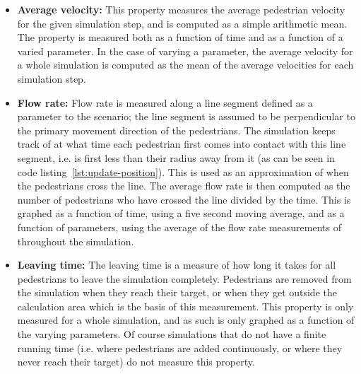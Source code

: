 \begin{itemize}

    \item \textbf{Average velocity:} This property measures the average pedestrian 
        velocity for the given simulation step, and is computed as a simple 
        arithmetic mean. The property is measured both as a function of time 
        and as a function of a varied parameter. In the case of varying a 
        parameter, the average velocity for a whole simulation is computed as 
        the mean of the average velocities for each simulation step.

    \item \textbf{Flow rate:} Flow rate is measured along a line segment 
        defined as a parameter to the scenario; the line segment is assumed to 
        be perpendicular to the primary movement direction of the pedestrians. 
        The simulation keeps track of at what time each pedestrian first comes 
        into contact with this line segment, i.e. is first less than their 
        radius away from it (as can be seen in code 
        listing~\ref{lst:update-position}). This is used as an approximation 
        of when the pedestrians cross the line. The average flow rate is then 
        computed as the number of pedestrians who have crossed the line 
        divided by the time.  This is graphed as a function of time, using a 
        five second moving average, and as a function of parameters, using the 
        average of the flow rate measurements of throughout the simulation.

    \item \textbf{Leaving time:} The leaving time is a measure of how long it 
        takes for all pedestrians to leave the simulation completely. Pedestrians are 
        removed from the simulation when they reach their target, or when they 
        get outside the calculation area which is the basis of this 
        measurement. This property is only measured for a whole simulation, 
        and as such is only graphed as a function of the varying parameters. 
        Of course simulations that do not have a finite running time (i.e. 
        where pedestrians are added continuously, or where they never reach their 
        target) do not measure this property.
\end{itemize}
